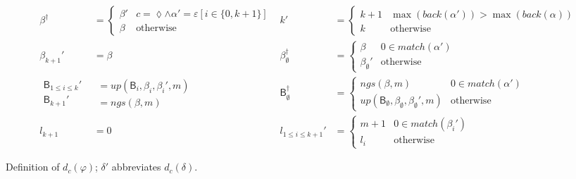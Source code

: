 \documentclass[submission,copyright,creativecommons]{eptcs}
\newcommand{\eos}{\lozenge}
\newcommand{\g}[1]{\mathsf{#1}}
\newcommand{\upd}{up}
\newcommand{\ngs}{ngs}
\begin{document}
\begin{table*}
\begin{subfigure}[t]{\textwidth}
\begin{align*}
\beta^\dagger                   & = \begin{cases} \beta' & c = \eos \land \alpha' = \varepsilon[i \in \{0, k+1\}] \\
                                                  \beta  & \text{otherwise} \end{cases} &
k'                              & = \begin{cases} k+1 & \max(back(\alpha')) > \max(back(\alpha)) \\
                                                  k   & \text{otherwise} \end{cases} \\
\beta_{k+1}'                    & = \beta &
\beta_\emptyset^\dagger         & = \begin{cases} \beta            & 0 \in match(\alpha') \\
                                                  \beta_\emptyset' & \text{otherwise} \end{cases} \\
\begin{aligned}\g{B}_{1 \leq i \leq k}' \\ \g{B}_{k+1}'\end{aligned} &
\begin{aligned} = \upd(\g{B}_i,\beta_i,\beta_i',m) \\ = \ngs(\beta,m)~~~~~~~~~~\end{aligned} &
\g{B}_\emptyset^\dagger         & = \begin{cases} \ngs(\beta,m)                           & 0 \in match(\alpha') \\
                                                  \upd(\g{B}_\emptyset,\beta_\emptyset,\beta_\emptyset',m) & \text{otherwise} \end{cases} \\
l_{k+1}                         & = 0 &
l_{1 \leq i \leq k+1}'          & = \begin{cases} m+1 & 0 \in match(\beta_i') \\
                                                  l_i & \text{otherwise} \end{cases}
\end{align*}
\end{subfigure}
\caption[Expression derivatives]{Definition of $d_c(\varphi)$; $\delta'$ abbreviates $d_c(\delta)$.}
\label{deriv-table}
\end{table*}
\end{document}
